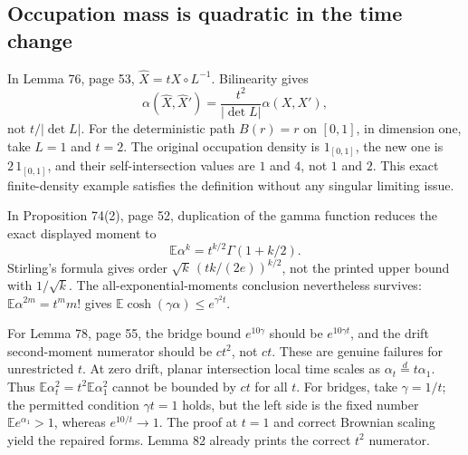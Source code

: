 \documentclass[10pt]{article}
\begin{document}
\subsection*{Occupation mass is quadratic in the time change}
In Lemma 76, page 53, \(\widehat X=tX\circ L^{-1}\). Bilinearity gives \[\alpha(\widehat X,\widehat X')
 =\frac{t^2}{|\det L|}\alpha(X,X'),\] not \(t/|\det L|\). For the deterministic path \(B(r)=r\) on \([0,1]\), in dimension one, take \(L=1\) and \(t=2\). The original occupation density is \(1_{[0,1]}\), the new one is \(2\,1_{[0,1]}\), and their self-intersection values are \(1\) and \(4\), not \(1\) and \(2\). This exact finite-density example satisfies the definition without any singular limiting issue.\par
In Proposition 74(2), page 52, duplication of the gamma function reduces the exact displayed moment to \[\mathbb E\alpha^k=t^{k/2}\Gamma(1+k/2).\] Stirling’s formula gives order \(\sqrt{k}\,(tk/(2e))^{k/2}\), not the printed upper bound with \(1/\sqrt{k}\). The all-exponential-moments conclusion nevertheless survives: \(\mathbb E\alpha^{2m}=t^m m!\) gives \(\mathbb E\cosh(\gamma\alpha)\le e^{\gamma^2t}\).\par
For Lemma 78, page 55, the bridge bound \(e^{10\gamma}\) should be \(e^{10\gamma t}\), and the drift second-moment numerator should be \(ct^2\), not \(ct\). These are genuine failures for unrestricted \(t\). At zero drift, planar intersection local time scales as \(\alpha_t\stackrel d=t\alpha_1\). Thus \(\mathbb E\alpha_t^2=t^2\mathbb E\alpha_1^2\) cannot be bounded by \(ct\) for all \(t\). For bridges, take \(\gamma=1/t\); the permitted condition \(\gamma t=1\) holds, but the left side is the fixed number \(\mathbb Ee^{\alpha_1}>1\), whereas \(e^{10/t}\to1\). The proof at \(t=1\) and correct Brownian scaling yield the repaired forms. Lemma 82 already prints the correct \(t^2\) numerator.\par
\end{document}
